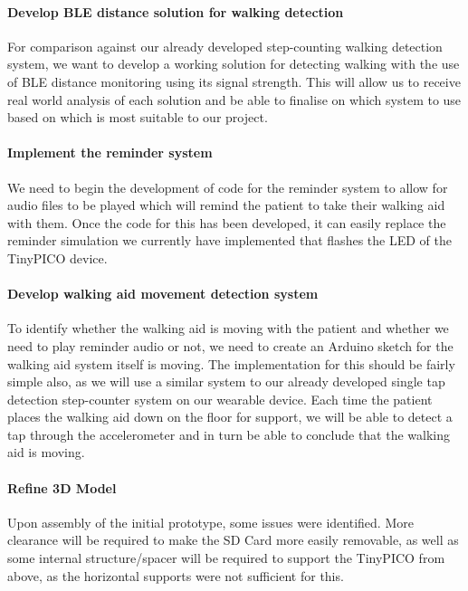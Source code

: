 {\paragraph{Develop BLE distance solution for walking detection}

For comparison against our already developed step-counting walking detection system, we want to develop a working solution for detecting walking with the use of BLE distance monitoring using its signal strength. This will allow us to receive real world analysis of each solution and be able to finalise on which system to use based on which is most suitable to our project.

\paragraph{Implement the reminder system}

We need to begin the development of code for the reminder system to allow for audio files to be played which will remind the patient to take their walking aid with them. Once the code for this has been developed, it can easily replace the reminder simulation we currently have implemented that flashes the LED of the TinyPICO device.

\paragraph{Develop walking aid movement detection system}

To identify whether the walking aid is moving with the patient and whether we need to play reminder audio or not, we need to create an Arduino sketch for the walking aid system itself is moving. The implementation for this should be fairly simple also, as we will use a similar system to our already developed single tap detection step-counter system on our wearable device. Each time the patient places the walking aid down on the floor for support, we will be able to detect a tap through the accelerometer and in turn be able to conclude that the walking aid is moving.

\paragraph{Refine 3D Model}

Upon assembly of the initial prototype, some issues were identified. More clearance will be required to make the SD Card more easily removable, as well as some internal structure/spacer will be required to support the TinyPICO from above, as the horizontal supports were not sufficient for this. 

}
